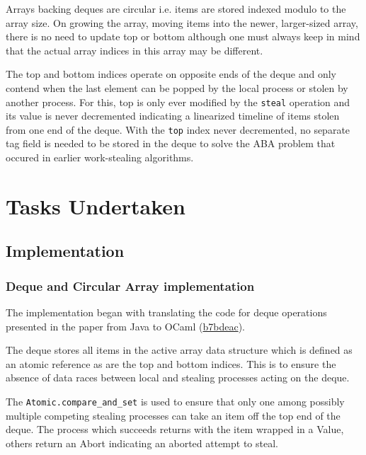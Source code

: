 \documentclass[11pt,a4paper]{article}
\begin{document}
Arrays backing deques are circular i.e. items are stored indexed modulo to the
array size. On growing the array, moving items into the newer, larger-sized
array, there is no need to update top or bottom although one must always keep in
mind that the actual array indices in this array may be different.

The top and bottom indices operate on opposite ends of the deque and only
contend when the last element can be popped by the local process or stolen
by another process. For this, top is only ever modified by the \texttt{steal}
operation and its value is never decremented indicating a linearized timeline of
items stolen from one end of the deque. With the \texttt{top} index never decremented,
no separate tag field is needed to be stored in the deque to solve the ABA
problem that occured in earlier work-stealing algorithms.

\section{Tasks Undertaken}
\label{sec:tasks}

\subsection{Implementation}
\subsubsection{Deque and Circular Array implementation}

The implementation began with translating the code for deque operations
presented in the \cite{chase2005dynamic} paper from Java to OCaml
(\href{https://github.com/alinab/fork-cs6868_s26/commit/b7bdeac9167f5fbeaee63e81deceaf0c43733d98}{b7bdeac}).

The deque stores all items in the active array data structure which is defined
as an atomic reference as are the top and bottom indices. This is to ensure the
absence of data races between local and stealing processes acting on the deque.

The \texttt{Atomic.compare\_and\_set} is used to ensure that only one among
possibly multiple competing stealing processes can take an item off the top
end of the deque. The process which succeeds returns with the item wrapped in a
Value, others return an Abort indicating an aborted attempt to steal.
\end{document}
